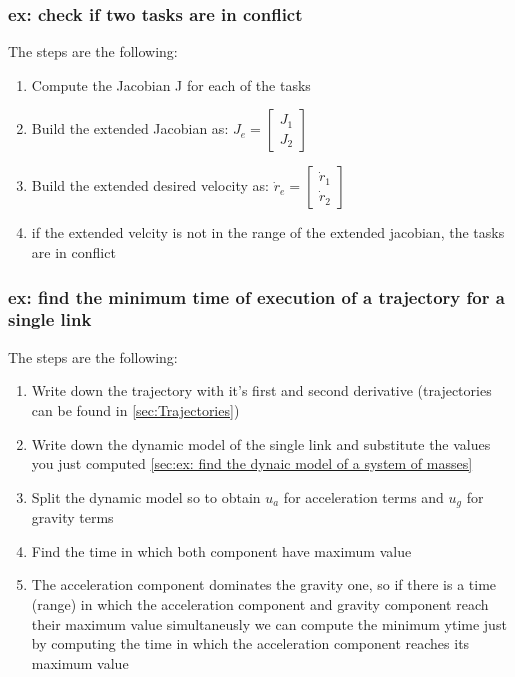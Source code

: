 \documentclass[a4paper,12pt]{article}
\begin{document}
\subsubsection{ex: check if two tasks are in conflict}
The steps are the following:
\begin{enumerate}
    \item Compute the Jacobian J for each of the tasks
    \item Build the extended Jacobian as: $J_e = \begin{bmatrix}
        J_1 \\
        J_2
    \end{bmatrix}$
    \item Build the extended desired velocity as: $\dot{r}_e = \begin{bmatrix}
        \dot{r}_1 \\
        \dot{r}_2
    \end{bmatrix}$
    \item if the extended velcity is not in the range of 
    the extended jacobian, the tasks are in conflict
\end{enumerate}

\subsubsection{ex: find the minimum time of execution of a trajectory for a single link}
The steps are the following:
\begin{enumerate}
    \item Write down the trajectory with it's first and second derivative (trajectories can be found in \ref{sec:Trajectories})
    \item Write down the dynamic model of the single link and substitute the values 
    you just computed \ref{sec:ex: find the dynaic model of a system of masses}
    \item Split the dynamic model so to obtain $u_a$ for acceleration terms and $u_g$ for gravity terms
    \item Find the time in which both component have maximum value
    \item The acceleration component dominates the gravity one, so if there 
    is a time (range) in which the acceleration component and gravity component
     reach their maximum value simultaneusly we can compute the minimum ytime just by 
        computing the time in which the acceleration component reaches its maximum value 
\end{enumerate}
\end{document}
